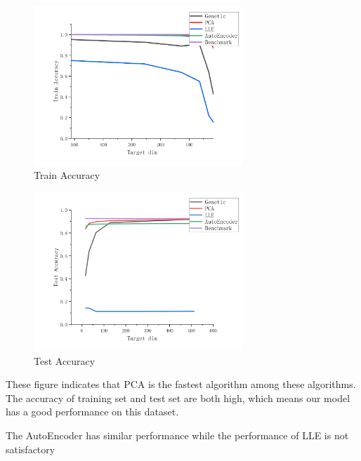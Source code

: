\documentclass[lang=cn]{elegantpaper}
\begin{document}
\begin{figure}[h]
    \centering
    \includegraphics[width=0.7\textwidth]{TrainAccuracy.png}
    \caption{Train Accuracy}
    \label{TrainAccuracy}
\end{figure}

\begin{figure}[h]
    \centering
    \includegraphics[width=0.7\textwidth]{TestAccuracy.png}
    \caption{Test Accuracy}
    \label{TestAccuracy}
\end{figure}

These figure indicates that PCA is the fastest algorithm among these algorithms. The accuracy of training set and test set are both high, which means our model has a good performance on this dataset.

The AutoEncoder has similar performance while the performance of LLE is not satisfactory
\end{document}
